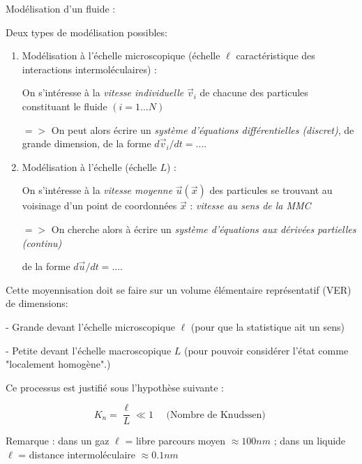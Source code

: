 \begin{frame}{Modélisation d'un fluide :}

\small

Deux types de modélisation possibles:
\pause
\begin{enumerate}
\item Modélisation à l'échelle microscopique (échelle $\ell$ caractéristique des interactions intermoléculaires) :

On s'intéresse à la {\em vitesse individuelle} $\vec v_i$ de chacune des particules constituant le fluide 
$(i = 1...N)$


$=>$ On peut alors écrire un {\em système d'équations différentielles (discret)}, de grande dimension, de la forme $d \vec{v}_i / dt = ....$ 
 

\pause
\item Modélisation à l'échelle (échelle $L$) : 

On s'intéresse à la  {\em vitesse moyenne} $\vec{u}(\vec x)$ 
des particules se trouvant au voisinage d'un point de coordonnées $\vec x$ :  {\em vitesse au sens de la MMC}

$=>$ On cherche alors à écrire un {\em système d'équations aux dérivées partielles (continu)} 

de la forme $d \vec u / dt = ....$ 

\end{enumerate}

\pause
\medskip 

Cette moyennisation doit se faire sur un volume élémentaire représentatif (VER) de dimensions:

- Grande devant l'échelle microscopique $\ell$ (pour que la statistique ait un sens)

- Petite devant l'échelle macroscopique $L$ (pour pouvoir considérer l'état comme "localement homogène".)

\pause
\medskip 

Ce processus est justifié sous l'hypothèse suivante : 

$$
 K_n = \frac{\ell}{L} \ll 1 \quad \mbox{ (Nombre de Knudssen) }
$$

\pause
\smallskip
Remarque : dans un gaz $\ell$ =  libre parcours moyen $\approx 100 nm$ ; dans un liquide   $\ell$ =  distance intermoléculaire $\approx 0.1 nm$ 

\end{frame}






